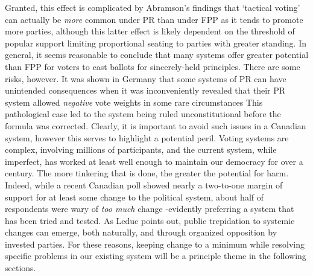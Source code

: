 Granted, this effect is complicated by Abramson's findings that `tactical voting' can actually be \emph{more} common under PR than under FPP as it tends to promote more parties\citep{Abramson_2010}, although this latter effect is likely dependent on the threshold of popular support limiting proportional seating to parties with greater standing.
In general, it seems reasonable to conclude that many systems offer greater potential than FPP for voters to cast ballots for sincerely-held principles.
There are some risks, however. It was shown in Germany that some systems of PR can have unintended consequences when it was inconveniently revealed that their PR system allowed \emph{negative} vote weights in some rare circumstances\citep{Die_Zeit_negative_vote}
This pathological case led to the system being ruled unconstitutional before the formula was corrected.
Clearly, it is important to avoid such issues in a Canadian system, however this serves to highlight a potential peril.
Voting systems are complex, involving millions of participants, and the current system, while imperfect, has worked at least well enough to maintain our democracy for over a century.
The more tinkering that is done, the greater the potential for harm.
Indeed, while a recent Canadian poll\citep{Broadbent_poll} showed nearly a two-to-one margin of support for at least some change to the political system, about half of respondents were wary of \emph{too much} change \--evidently preferring a system that has been tried and tested.
As Leduc points out\citep{Leduc}, public trepidation to systemic changes can emerge, both naturally, and through organized opposition by invested parties.
For these reasons, keeping change to a minimum while resolving specific problems in our existing system will be a principle theme in the following sections.


